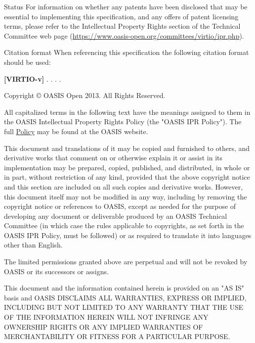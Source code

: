 \begin{titlepage}
\begin{oasistitlesection}{Status}
For information on whether any patents have been disclosed that
may be essential to implementing this specification, and any
offers of patent licensing terms, please refer to the
Intellectual Property Rights section of the Technical Committee
web page (\url{https://www.oasis-open.org/committees/virtio/ipr.php}).
\end{oasistitlesection}


\begin{oasistitlesection}{Citation format}
When referencing this specification the following citation format should be used:\newline

\textbf{[VIRTIO-v\virtiorev]}\newline
\textit{\virtioversion}. \virtioworkingdraftdate.
\virtiodraftoasisstagename \virtiodraftstageextra . \virtiourlhtml .
\end{oasistitlesection}

\vfill\newpage


Copyright © OASIS Open 2013. All Rights Reserved.

All capitalized terms in the following text have the meanings assigned
to them in the OASIS Intellectual Property Rights Policy (the "OASIS
IPR Policy"). The full \href{https://www.oasis-open.org/policies-guidelines/ipr}{Policy} may be found at the OASIS website.

This document and translations of it may be copied and furnished to
others, and derivative works that comment on or otherwise explain it
or assist in its implementation may be prepared, copied, published,
and distributed, in whole or in part, without restriction of any kind,
provided that the above copyright notice and this section are included
on all such copies and derivative works. However, this document itself
may not be modified in any way, including by removing the copyright
notice or references to OASIS, except as needed for the purpose of
developing any document or deliverable produced by an OASIS Technical
Committee (in which case the rules applicable to copyrights, as set
forth in the OASIS IPR Policy, must be followed) or as required to
translate it into languages other than English.

The limited permissions granted above are perpetual and will not be
revoked by OASIS or its successors or assigns.

This document and the information contained herein is provided on an
"AS IS" basis and OASIS DISCLAIMS ALL WARRANTIES, EXPRESS OR IMPLIED,
INCLUDING BUT NOT LIMITED TO ANY WARRANTY THAT THE USE OF THE
INFORMATION HEREIN WILL NOT INFRINGE ANY OWNERSHIP RIGHTS OR ANY
IMPLIED WARRANTIES OF MERCHANTABILITY OR FITNESS FOR A PARTICULAR
PURPOSE.


\end{titlepage}
